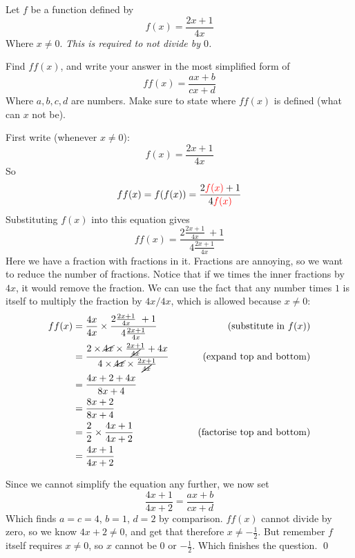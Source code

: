 \begin{example} \label{ex:simple-composition2}
    Let $f$ be a function defined by 
    \[ f(x) = \frac{2x + 1}{4x}\]
    Where $x \neq 0$. \emph{This is required to not divide by $0$.}

    Find $ff(x)$, and write your answer in the most simplified form of
    \[ff(x) = \frac{ax + b}{cx + d}\]
    Where $a,b,c,d$ are numbers. Make sure to state where $ff(x)$ is defined (what can $x$ not be).
\end{example}
\begin{solution}
    First write (whenever $x\neq 0$):
   \[ f(x) = \frac{2x + 1}{4x}\]
    So 
    \[ ff(x) = f(f(x)) = \frac{2\textcolor{red}{f(x)} + 1}{4\textcolor{red}{f(x)}}\]
    Substituting $f(x)$ into this equation gives 
    \[ ff(x) =  \frac{2\frac{2x + 1}{4x}\ + 1}{4 \frac{2x + 1}{4x}}\]
    Here we have a fraction with fractions in it. Fractions are annoying, so we want to reduce the number of fractions. Notice that if we times the inner fractions by 
    $4x$, it would remove the fraction. 
    We can use the fact that any number times $1$ is itself to multiply the fraction by $4x/4x$, which is allowed because $x\neq 0$:
    \begin{align*}
        ff(x) &=  \frac{4x}{4x} \times \frac{2\frac{2x + 1}{4x}\ + 1}{4 \frac{2x + 1}{4x}} & \tag*{(substitute in $f(x)$)}\\
            &= \frac{2\times \cancel{4x} \times \frac{2x + 1}{\cancel{4x}} + 4x}{4 \times \cancel{4x} \times \frac{2x + 1}{\cancel{4x}}} & \tag*{(expand top and bottom)}\\
            &= \frac{4x + 2 + 4x}{8x + 4} \\
            &= \frac{8x + 2}{8x + 4} \\
            &= \frac{2}{2} \times \frac{4x + 1}{4x + 2} & \tag*{(factorise top and bottom)}\\
            &= \frac{4x + 1}{4x + 2}
    \end{align*}

    Since we cannot simplify the equation any further, we now set 
    \[ \frac{4x + 1}{4x + 2} = \frac{ax + b}{cx + d}\]
    Which finds $a = c = 4$, $b = 1$, $d = 2$ by comparison.
    $ff(x)$ cannot divide by zero, so we know  $4x+2 \neq 0$, and get that therefore  
    $x \neq - \frac{1}{2} $. But remember $f$ itself requires $x \neq 0$, so $x$ cannot be $0$ or $-\frac{1}{2}$.
    Which finishes the question.
    \qed 
\end{solution}

